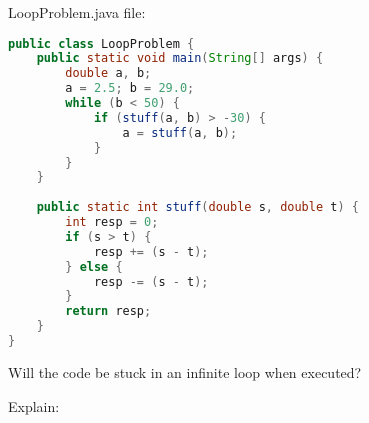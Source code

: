 \documentclass[9pt]{article}
\begin{document}
\begin{multicols}{2}
LoopProblem.java file:
\begin{lstlisting}[language=Java]
public class LoopProblem {
	public static void main(String[] args) {
		double a, b;
		a = 2.5; b = 29.0;
		while (b < 50) {
			if (stuff(a, b) > -30) {
				a = stuff(a, b);
			}
		}
	}
	
	public static int stuff(double s, double t) {
		int resp = 0;
		if (s > t) {
			resp += (s - t);
		} else {
			resp -= (s - t);
		}
		return resp;
	}
}
\end{lstlisting}

\vfill
\columnbreak
Will the code be stuck in an infinite loop when executed?
\hfill\vspace{5mm}

Explain:

\end{multicols}
\end{document}
